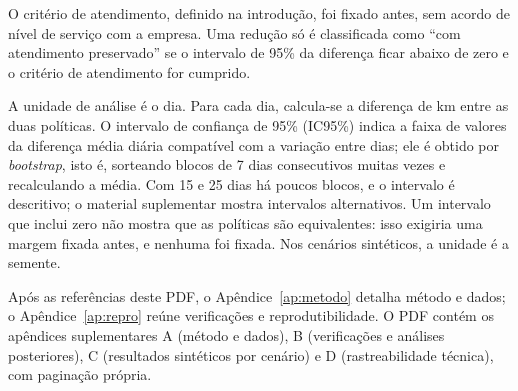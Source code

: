 O critério de atendimento, definido na introdução, foi fixado antes, sem acordo de nível de serviço com a empresa. Uma redução só é classificada como \enquote{com atendimento preservado} se o intervalo de 95\% da diferença ficar abaixo de zero e o critério de atendimento for cumprido.

A unidade de análise é o dia. Para cada dia, calcula-se a diferença de km entre as duas políticas. O intervalo de confiança de 95\% (IC95\%) indica a faixa de valores da diferença média diária compatível com a variação entre dias; ele é obtido por \textit{bootstrap}, isto é, sorteando blocos de 7 dias consecutivos muitas vezes e recalculando a média. Com 15 e 25 dias há poucos blocos, e o intervalo é descritivo; o material suplementar mostra intervalos alternativos. Um intervalo que inclui zero não mostra que as políticas são equivalentes: isso exigiria uma margem fixada antes, e nenhuma foi fixada. Nos cenários sintéticos, a unidade é a semente.

Após as referências deste PDF, o Apêndice~\ref{ap:metodo} detalha método e dados; o Apêndice~\ref{ap:repro} reúne verificações e reprodutibilidade. O PDF  contém os apêndices suplementares A (método e dados), B (verificações e análises posteriores), C (resultados sintéticos por cenário) e D (rastreabilidade técnica), com paginação própria.
